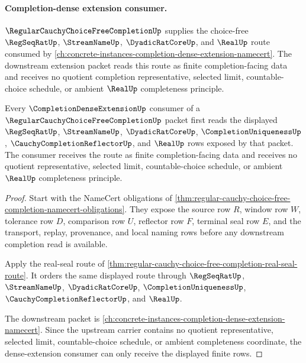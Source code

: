 \paragraph{Completion-dense extension consumer.}
$\RegularCauchyChoiceFreeCompletionUp$ supplies the choice-free $\RegSeqRatUp$, $\StreamNameUp$, $\DyadicRatCoreUp$, and $\RealUp$ route consumed by \autoref{ch:concrete-instances-completion-dense-extension-namecert}. The downstream extension packet reads this route as finite completion-facing data and receives no quotient completion representative, selected limit, countable-choice schedule, or ambient $\RealUp$ completeness principle.

\begin{theorem}
\label{thm:regular-cauchy-choice-free-completion-dense-extension-route}
Every $\CompletionDenseExtensionUp$ consumer of a $\RegularCauchyChoiceFreeCompletionUp$ packet first reads the displayed $\RegSeqRatUp$, $\StreamNameUp$, $\DyadicRatCoreUp$, $\CompletionUniquenessUp$, $\CauchyCompletionReflectorUp$, and $\RealUp$ rows exposed by that packet. The consumer receives the route as finite completion-facing data and receives no quotient representative, selected limit, countable-choice schedule, or ambient $\RealUp$ completeness principle.
\end{theorem}
\begin{proof}
Start with the NameCert obligations of \autoref{thm:regular-cauchy-choice-free-completion-namecert-obligations}. They expose the source row $R$, window row $W$, tolerance row $D$, comparison row $U$, reflector row $F$, terminal seal row $E$, and the transport, replay, provenance, and local naming rows before any downstream completion read is available.

Apply the real-seal route of \autoref{thm:regular-cauchy-choice-free-completion-real-seal-route}. It orders the same displayed route through $\RegSeqRatUp$, $\StreamNameUp$, $\DyadicRatCoreUp$, $\CompletionUniquenessUp$, $\CauchyCompletionReflectorUp$, and $\RealUp$.

The downstream packet is \autoref{ch:concrete-instances-completion-dense-extension-namecert}. Since the upstream carrier contains no quotient representative, selected limit, countable-choice schedule, or ambient completeness coordinate, the dense-extension consumer can only receive the displayed finite rows.
\end{proof}

